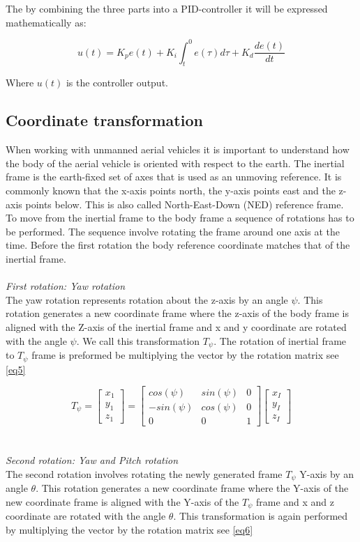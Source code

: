 \documentclass[conference]{IEEEtran}
\begin{document}
The by combining the three parts into a PID-controller it will be expressed mathematically as:
 
\begin{equation}
u(t) = K_p e(t)+ K_i \int_{t}^{0}  e(\tau) d\tau+K_d \frac{de(t)}{dt} \label{eq4}
\end{equation}

Where $u(t)$ is the controller output. 

\subsection{Coordinate transformation}
When working with unmanned aerial vehicles it is important to understand how the body of the aerial vehicle is oriented with respect to the earth.
The inertial frame is the earth-fixed set of axes that is used as an unmoving reference.  It is commonly known that the x-axis points north, the y-axis points east and the z-axis points below. This is also called North-East-Down (NED) reference frame. 
To move from the inertial frame to the body frame a sequence of rotations has to be performed. The sequence involve rotating the frame around one axis at the time. Before the first rotation the body reference coordinate matches that of the inertial frame. \\\\
\textit{First rotation: Yaw rotation}\\
The yaw rotation represents rotation about the z-axis by an angle $\psi$. This rotation generates a new coordinate frame where the z-axis of the body frame is aligned with the Z-axis of the inertial frame and x and y coordinate are rotated with the angle $\psi$. We call this transformation $T_\psi$. The rotation of inertial frame to $T_\psi$ frame is preformed be multiplying the vector by the rotation matrix see \cref{eq5} 

\begin{equation}
T_\psi=
\begin{bmatrix}
x_1\\
y_1\\
z_1 
\end{bmatrix}=
\begin{bmatrix}
cos(\psi) & sin(\psi) & 0\\
-sin(\psi) & cos(\psi) & 0 \\
0 & 0 & 1
\end{bmatrix}
\begin{bmatrix}
x_I\\
y_I\\
z_I 
\end{bmatrix}\label{eq5}
\end{equation}
\\\\
\textit{Second rotation: Yaw and Pitch rotation}\\
The second rotation involves rotating the newly generated frame $T_\psi$ Y-axis by an angle $\theta$. This rotation generates a new coordinate frame where the Y-axis of the new coordinate frame is aligned with the Y-axis of the $T_\psi$ frame and x and z coordinate are rotated with the angle $\theta$. This transformation is again performed by multiplying the vector by the rotation matrix see \cref{eq6}
\end{document}
